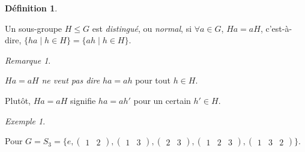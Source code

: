 \documentclass{report}
\newcommand*{\lte}{\leqslant}
\theoremstyle{definition}
\newtheorem*{defin}{D\'efinition}
\theoremstyle{remark}
\newtheorem*{exem}{Exemple}
\newtheorem*{rema}{Remarque}
\begin{document}
	\begin{defin}~

		Un sous-groupe $H \lte G$ est \emph{distingu\'e}, ou \emph{normal}, si $\forall a \in G$, $Ha=aH$, c'est-\`a-dire, $\{ha \mid h \in H\} = \{ah \mid h \in H\}$.
		\begin{rema}~

			$Ha=aH$ \emph{ne veut pas dire} $ha=ah$ pour tout $h \in H$.

			Plut\^ot, $Ha=aH$ signifie $ha=ah'$ pour un certain $h' \in H$.
		\end{rema}
	\end{defin}
	\begin{exem}~

		Pour $G = S_3 = \{e, \begin{pmatrix}
			1&2
		\end{pmatrix}, \begin{pmatrix}
			1&3
		\end{pmatrix}, \begin{pmatrix}
			2&3
		\end{pmatrix}, \begin{pmatrix}
			1&2&3
		\end{pmatrix}, \begin{pmatrix}
			1&3&2
		\end{pmatrix}\}$.


\end{exem}
\end{document}
